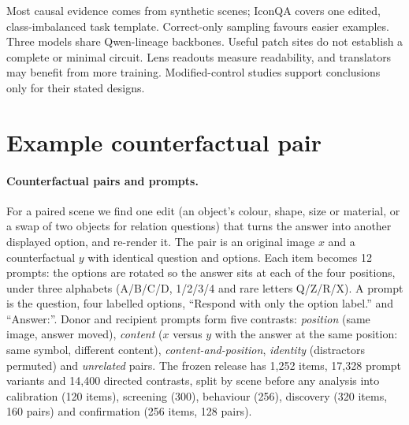\documentclass[11pt]{article}
\begin{document}
Most causal evidence comes from synthetic scenes; IconQA covers one edited, class-imbalanced task template. Correct-only sampling favours easier examples. Three models share Qwen-lineage backbones. Useful patch sites do not establish a complete or minimal circuit. Lens readouts measure readability, and translators may benefit from more training. Modified-control studies support conclusions only for their stated designs.


\label{references-start}


\clearpage
\appendix
\label{appendix-start}

\section{Example counterfactual pair}
\label{app:example}

\paragraph{Counterfactual pairs and prompts.} For a paired scene we find one edit (an object's colour, shape, size or material, or a swap of two objects for relation questions) that turns the answer into another displayed option, and re-render it. The pair is an original image $x$ and a counterfactual $y$ with identical question and options. Each item becomes 12 prompts: the options are rotated so the answer sits at each of the four positions, under three alphabets (A/B/C/D, 1/2/3/4 and rare letters Q/Z/R/X). A prompt is the question, four labelled options, ``Respond with only the option label.'' and ``Answer:''. Donor and recipient prompts form five contrasts: \emph{position} (same image, answer moved), \emph{content} ($x$ versus $y$ with the answer at the same position: same symbol, different content), \emph{content-and-position}, \emph{identity} (distractors permuted) and \emph{unrelated} pairs. The frozen release has 1,252 items, 17,328 prompt variants and 14,400 directed contrasts, split by scene before any analysis into calibration (120 items), screening (300), behaviour (256), discovery (320 items, 160 pairs) and confirmation (256 items, 128 pairs).
\end{document}
